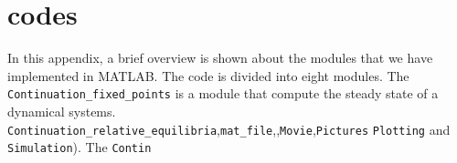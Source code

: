 \section{codes}
In this appendix, a brief overview is shown about the modules that we have implemented in MATLAB. The code is divided into eight modules. The \texttt{Continuation_fixed_points} is a module that compute the steady state of a dynamical systems. \texttt{Continuation_relative_equilibria},\texttt{mat_file},,\texttt{Movie},\texttt{Pictures}
\texttt{Plotting} and \texttt{Simulation}). The \texttt{Contin}
